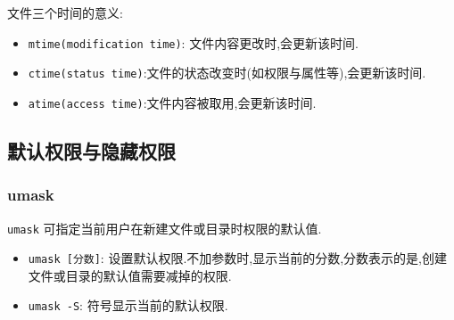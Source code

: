 文件三个时间的意义:
\begin{itemize}
    \item \texttt{mtime(modification time)}: 文件内容更改时,会更新该时间.

    \item \texttt{ctime(status time)}:文件的状态改变时(如权限与属性等),会更新该时间.

    \item \texttt{atime(access time)}:文件内容被取用,会更新该时间.
\end{itemize}

\subsection{默认权限与隐藏权限}
\subsubsection{umask}
\texttt{umask} 可指定当前用户在新建文件或目录时权限的默认值.
\begin{itemize}
    \item \texttt{umask [分数]}: 设置默认权限.不加参数时,显示当前的分数,分数表示的是,创建文件或目录的默认值需要减掉的权限.

    \item \texttt{umask -S}: 符号显示当前的默认权限.
\end{itemize}

